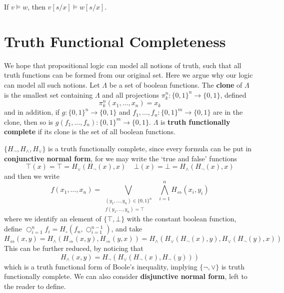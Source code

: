 \begin{corollary}
    If $v \vDash w$, then $v[s/x] \vDash w[s/x]$.
\end{corollary}

\section{Truth Functional Completeness}

We hope that propositional logic can model all notions of truth, such that all truth functions can be formed from our original set. Here we argue why our logic can model all such notions. Let $\Lambda$ be a set of boolean functions. The {\bf clone} of $\Lambda$ is the smallest set containing $\Lambda$ and all projections $\pi^n_k : \{ 0, 1 \}^n \to \{ 0, 1 \}$, defined
%
\[ \pi^n_k(x_1, \dots, x_n) = x_k \]
%
and in addition, if $g: \{ 0, 1 \}^n \to \{ 0, 1 \}$ and $f_1, \dots, f_n : \{ 0, 1 \}^m \to \{ 0, 1 \}$ are in the clone, then so is $g(f_1, \dots, f_n): \{ 0, 1 \}^m \to \{ 0, 1 \}$. $\Lambda$ is {\bf truth functionally complete} if its clone is the set of all boolean functions.

\begin{example}
    $\{ H_\neg, H_\wedge, H_\vee \}$ is a truth functionally complete, since every formula can be put in {\bf conjunctive normal form}, for we may write the `true and false' functions
    \[ \top(x) = \top = H_\vee(H_\neg(x), x)\ \ \ \ \ \bot(x) = \bot = H_\wedge(H_\neg(x), x) \]
    and then we write
    \[ f(x_1, \dots, x_n) = \bigvee_{\substack{(y_1, \dots, y_n) \in \{ 0, 1 \}^n\\f(y_1, \dots, y_n) = \top}}\ \  \bigwedge_{i = 1}^n H_\Leftrightarrow(x_i, y_i) \]
    where we identify an element of $\{ \top, \bot \}$ with the constant boolean function, define $\bigcirc_{i = 1}^n f_i = H_\circ(f_n, \bigcirc_{i = 1}^{n-1})$, and take
    \[ H_\Leftrightarrow(x,y) = H_\wedge(H_\Rightarrow(x,y), H_\Rightarrow(y,x)) = H_\wedge(H_\vee(H_\neg(x), y), H_\vee(H_\neg(y), x)) \]
    This can be further reduced, by noticing that
    \[ H_\wedge(x,y) = H_\neg(H_\vee(H_\neg(x), H_\neg(y))) \]
    which is a truth functional form of Boole's inequality, implying $\{ \neg, \vee \}$ is truth functionally complete. We can also consider {\bf disjunctive normal form}, left to the reader to define.
\end{example}

